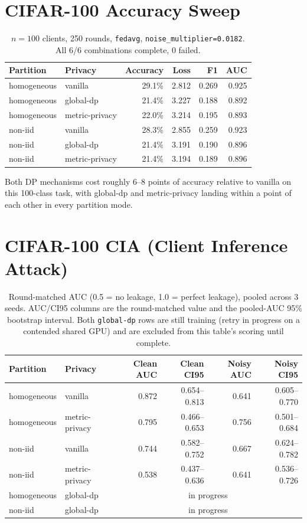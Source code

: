 \documentclass[11pt]{article}
\newcommand{\code}[1]{\texttt{#1}}
\begin{document}
\section*{CIFAR-100 Accuracy Sweep}

\begin{table}[h!]
\centering
\begin{tabular}{llrrrr}
\toprule
Partition & Privacy & Accuracy & Loss & F1 & AUC \\
\midrule
homogeneous & vanilla & 29.1\% & 2.812 & 0.269 & 0.925 \\
homogeneous & global-dp & 21.4\% & 3.227 & 0.188 & 0.892 \\
homogeneous & metric-privacy & 22.0\% & 3.214 & 0.195 & 0.893 \\
non-iid & vanilla & 28.3\% & 2.855 & 0.259 & 0.923 \\
non-iid & global-dp & 21.4\% & 3.191 & 0.190 & 0.896 \\
non-iid & metric-privacy & 21.4\% & 3.194 & 0.189 & 0.896 \\
\bottomrule
\end{tabular}
\caption*{$n=100$ clients, 250 rounds, \code{fedavg}, \code{noise\_multiplier=0.0182}. All 6/6
combinations complete, 0 failed.}
\end{table}

\noindent
Both DP mechanisms cost roughly 6--8 points of accuracy relative to vanilla on this 100-class
task, with global-dp and metric-privacy landing within a point of each other in every partition
mode.

\section*{CIFAR-100 CIA (Client Inference Attack)}

\begin{table}[h!]
\centering
\begin{tabular}{llrrrr}
\toprule
Partition & Privacy & Clean AUC & Clean CI95 & Noisy AUC & Noisy CI95 \\
\midrule
homogeneous & vanilla & 0.872 & 0.654--0.813 & 0.641 & 0.605--0.770 \\
homogeneous & metric-privacy & 0.795 & 0.466--0.653 & 0.756 & 0.501--0.684 \\
non-iid & vanilla & 0.744 & 0.582--0.752 & 0.667 & 0.624--0.782 \\
non-iid & metric-privacy & 0.538 & 0.437--0.636 & 0.641 & 0.536--0.726 \\
homogeneous & global-dp & \multicolumn{4}{c}{in progress} \\
non-iid & global-dp & \multicolumn{4}{c}{in progress} \\
\bottomrule
\end{tabular}
\caption*{Round-matched AUC (0.5 = no leakage, 1.0 = perfect leakage), pooled across 3 seeds.
AUC/CI95 columns are the round-matched value and the pooled-AUC 95\% bootstrap interval. Both
\code{global-dp} rows are still training (retry in progress on a contended shared GPU) and are
excluded from this table's scoring until complete.}
\end{table}
\end{document}
